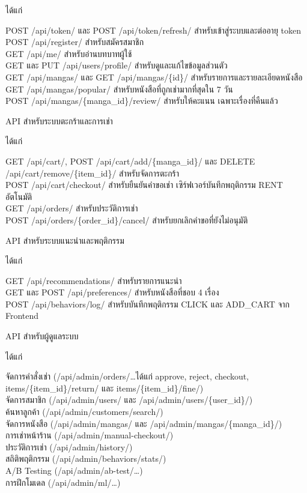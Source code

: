 \noindent ได้แก่

\noindent POST /api/token/ และ POST /api/token/refresh/ สำหรับเข้าสู่ระบบและต่ออายุ token \\
POST /api/register/ สำหรับสมัครสมาชิก \\
GET /api/me/ สำหรับอ่านบทบาทผู้ใช้ \\
GET และ PUT /api/users/profile/ สำหรับดูและแก้ไขข้อมูลส่วนตัว \\
GET /api/mangas/ และ GET /api/mangas/\{id\}/ สำหรับรายการและรายละเอียดหนังสือ \\
GET /api/mangas/popular/ สำหรับหนังสือที่ถูกเช่ามากที่สุดใน 7 วัน \\
POST /api/mangas/\{manga\_id\}/review/ สำหรับให้คะแนน เฉพาะเรื่องที่คืนแล้ว
\bigskip

API สำหรับระบบตะกร้าและการเช่า 

\noindent ได้แก่

\noindent GET /api/cart/, POST /api/cart/add/\{manga\_id\}/ และ DELETE /api/cart/remove/\{item\_id\}/ สำหรับจัดการตะกร้า \\
POST /api/cart/checkout/ สำหรับยืนยันคำขอเช่า เซิร์ฟเวอร์บันทึกพฤติกรรม RENT อัตโนมัติ \\
GET /api/orders/ สำหรับประวัติการเช่า \\
POST /api/orders/\{order\_id\}/cancel/ สำหรับยกเลิกคำขอที่ยังไม่อนุมัติ
\bigskip

API สำหรับระบบแนะนำและพฤติกรรม

\noindent ได้แก่

\noindent GET /api/recommendations/ สำหรับรายการแนะนำ \\
GET และ POST /api/preferences/ สำหรับหนังสือที่ชอบ 4 เรื่อง \\
POST /api/behaviors/log/ สำหรับบันทึกพฤติกรรม CLICK และ ADD\_CART จาก Frontend
\bigskip

API สำหรับผู้ดูแลระบบ

\noindent ได้แก่

\noindent จัดการคำสั่งเช่า (/api/admin/orders/\ldots ได้แก่ approve, reject, checkout, items/\{item\_id\}/return/ และ items/\{item\_id\}/fine/) \\
จัดการสมาชิก (/api/admin/users/ และ /api/admin/users/\{user\_id\}/) \\
ค้นหาลูกค้า (/api/admin/customers/search/) \\
จัดการหนังสือ (/api/admin/mangas/ และ /api/admin/mangas/\{manga\_id\}/) \\
การเช่าหน้าร้าน (/api/admin/manual-checkout/) \\
ประวัติการเช่า (/api/admin/history/) \\
สถิติพฤติกรรม (/api/admin/behaviors/stats/) \\
A/B Testing (/api/admin/ab-test/\ldots) \\
การฝึกโมเดล (/api/admin/ml/\ldots)

